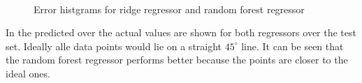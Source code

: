 \documentclass[12pt,a4paper]{scrartcl}
\begin{document}
	
	\begin{figure}[H]
		\centering	
		\\
		\caption{Error histgrams for ridge regressor and random forest regressor}
		\label{fig:ex1_3_hist_lin_rf}
	\end{figure}
	

	In  the predicted over the actual values are shown for both regressors over the test set. Ideally alle data points would lie on a straight $ 45^ \circ $ line. It can be seen that the random forest regressor performs better because the points are closer to the ideal ones.
	
\end{document}
